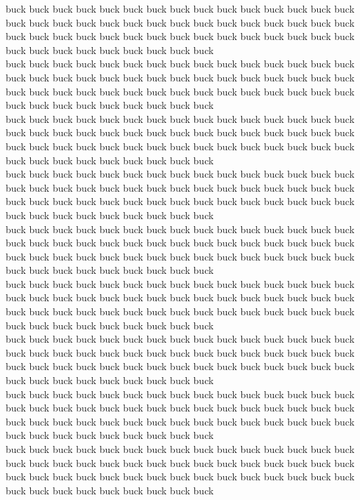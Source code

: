 buck buck buck buck buck buck buck buck buck buck buck buck buck buck buck buck buck buck buck buck buck buck buck buck buck buck buck buck buck buck buck buck buck buck buck buck buck buck buck buck buck buck buck buck buck buck buck buck buck buck buck buck buck buck\\
buck buck buck buck buck buck buck buck buck buck buck buck buck buck buck buck buck buck buck buck buck buck buck buck buck buck buck buck buck buck buck buck buck buck buck buck buck buck buck buck buck buck buck buck buck buck buck buck buck buck buck buck buck buck\\
buck buck buck buck buck buck buck buck buck buck buck buck buck buck buck buck buck buck buck buck buck buck buck buck buck buck buck buck buck buck buck buck buck buck buck buck buck buck buck buck buck buck buck buck buck buck buck buck buck buck buck buck buck buck\\
buck buck buck buck buck buck buck buck buck buck buck buck buck buck buck buck buck buck buck buck buck buck buck buck buck buck buck buck buck buck buck buck buck buck buck buck buck buck buck buck buck buck buck buck buck buck buck buck buck buck buck buck buck buck\\
buck buck buck buck buck buck buck buck buck buck buck buck buck buck buck buck buck buck buck buck buck buck buck buck buck buck buck buck buck buck buck buck buck buck buck buck buck buck buck buck buck buck buck buck buck buck buck buck buck buck buck buck buck buck\\
buck buck buck buck buck buck buck buck buck buck buck buck buck buck buck buck buck buck buck buck buck buck buck buck buck buck buck buck buck buck buck buck buck buck buck buck buck buck buck buck buck buck buck buck buck buck buck buck buck buck buck buck buck buck\\
buck buck buck buck buck buck buck buck buck buck buck buck buck buck buck buck buck buck buck buck buck buck buck buck buck buck buck buck buck buck buck buck buck buck buck buck buck buck buck buck buck buck buck buck buck buck buck buck buck buck buck buck buck buck\\
buck buck buck buck buck buck buck buck buck buck buck buck buck buck buck buck buck buck buck buck buck buck buck buck buck buck buck buck buck buck buck buck buck buck buck buck buck buck buck buck buck buck buck buck buck buck buck buck buck buck buck buck buck buck\\
buck buck buck buck buck buck buck buck buck buck buck buck buck buck buck buck buck buck buck buck buck buck buck buck buck buck buck buck buck buck buck buck buck buck buck buck buck buck buck buck buck buck buck buck buck buck buck buck buck buck buck buck buck buck\\
